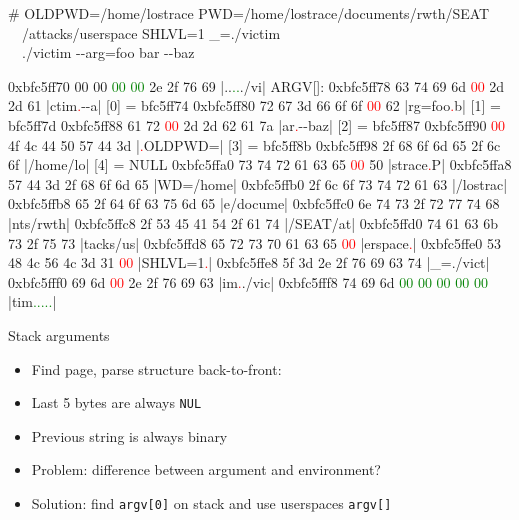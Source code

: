\documentclass{beamer}
\newenvironment{itemizeframe}[1]
  {\begin{frame}{#1}\startitemizeframe}
  {\stopitemizeframe\end{frame}}
\newcommand\startitemizeframe{\begin{itemize}}
\newcommand\stopitemizeframe{\end{itemize}}
\begin{document}
		\begin{frame}[fragile]
			\scriptsize
			\begin{semiverbatim}
			# OLDPWD=/home/lostrace PWD=/home/lostrace/documents/rwth/SEAT\ \\
			\ \ /attacks/userspace SHLVL=1 _=./victim \ \\
			\ \ ./victim {-}{-}arg=foo bar {-}{-}baz

			0xbfc5ff70  00 00 \textcolor{green}{00 00} 2e 2f 76 69  |..\textcolor{green}{..}./vi|    ARGV[]:
			0xbfc5ff78  63 74 69 6d \textcolor{red}{00} 2d 2d 61  |ctim\textcolor{red}{.}{-}{-}a|      [0] = bfc5ff74
			0xbfc5ff80  72 67 3d 66 6f 6f \textcolor{red}{00} 62  |rg=foo\textcolor{red}{.}b|      [1] = bfc5ff7d
			0xbfc5ff88  61 72 \textcolor{red}{00} 2d 2d 62 61 7a  |ar\textcolor{red}{.}{-}{-}baz|      [2] = bfc5ff87
			0xbfc5ff90  \textcolor{red}{00} 4f 4c 44 50 57 44 3d  |\textcolor{red}{.}OLDPWD=|      [3] = bfc5ff8b
			0xbfc5ff98  2f 68 6f 6d 65 2f 6c 6f  |/home/lo|      [4] = NULL
			0xbfc5ffa0  73 74 72 61 63 65 \textcolor{red}{00} 50  |strace\textcolor{red}{.}P|
			0xbfc5ffa8  57 44 3d 2f 68 6f 6d 65  |WD=/home|
			0xbfc5ffb0  2f 6c 6f 73 74 72 61 63  |/lostrac|
			0xbfc5ffb8  65 2f 64 6f 63 75 6d 65  |e/docume|
			0xbfc5ffc0  6e 74 73 2f 72 77 74 68  |nts/rwth|
			0xbfc5ffc8  2f 53 45 41 54 2f 61 74  |/SEAT/at|
			0xbfc5ffd0  74 61 63 6b 73 2f 75 73  |tacks/us|
			0xbfc5ffd8  65 72 73 70 61 63 65 \textcolor{red}{00}  |erspace\textcolor{red}{.}|
			0xbfc5ffe0  53 48 4c 56 4c 3d 31 \textcolor{red}{00}  |SHLVL=1\textcolor{red}{.}|
			0xbfc5ffe8  5f 3d 2e 2f 76 69 63 74  |_=./vict|
			0xbfc5fff0  69 6d \textcolor{red}{00} 2e 2f 76 69 63  |im\textcolor{red}{.}./vic|
			0xbfc5fff8  74 69 6d \textcolor{green}{00 00 00 00 00}  |tim\textcolor{green}{.....}|
			\end{semiverbatim}
		\end{frame}

		\begin{itemizeframe}{Stack arguments}
			\item Find page, parse structure back-to-front:
			\item Last 5 bytes are always \texttt{NUL}
			\item Previous string is always binary
			\item \alert{Problem}: difference between argument and environment?
			\item Solution: find \texttt{argv[0]} on stack and use userspaces \texttt{argv[]}
		\end{itemizeframe}
\end{document}
